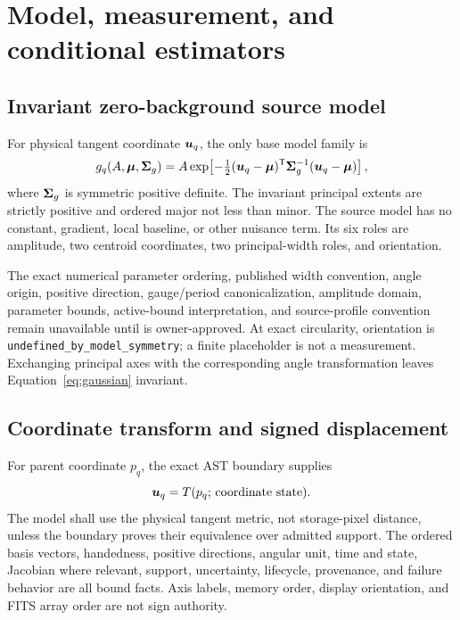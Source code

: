 \section{Model, measurement, and conditional estimators}\label{sec:equations}

\subsection{Invariant zero-background source model}\label{sec:model}

For physical tangent coordinate $\boldsymbol{u}_q$, the only base model family is
\begin{equation}
g_q(A,\boldsymbol{\mu},\boldsymbol{\Sigma}_{g})
=A\exp\!\left[-\tfrac12(\boldsymbol{u}_q-\boldsymbol{\mu})^{\mathsf T}
\boldsymbol{\Sigma}_{g}^{-1}(\boldsymbol{u}_q-\boldsymbol{\mu})\right],
\label{eq:gaussian}
\end{equation}
where $\boldsymbol{\Sigma}_{g}$ is symmetric positive definite. The invariant principal
extents are strictly positive and ordered major not less than minor. The
source model has no constant, gradient, local baseline, or other nuisance
term. Its six roles are amplitude, two centroid coordinates, two
principal-width roles, and orientation.

The exact numerical parameter ordering, published width convention, angle
origin, positive direction, gauge/period canonicalization, amplitude domain,
parameter bounds, active-bound interpretation, and source-profile convention
remain unavailable until \CompatMethod{} is owner-approved. At exact
circularity, orientation is \texttt{undefined\_by\_model\_symmetry}; a finite
placeholder is not a measurement. Exchanging principal axes with the
corresponding angle transformation leaves Equation~\ref{eq:gaussian}
invariant.

\subsection{Coordinate transform and signed displacement}\label{sec:displacement}

For parent coordinate $p_q$, the exact AST boundary supplies
\begin{equation}
\boldsymbol{u}_q=T(p_q;\,\text{coordinate state}).
\label{eq:transform}
\end{equation}
The model shall use the physical tangent metric, not storage-pixel distance,
unless the boundary proves their equivalence over admitted support. The
ordered basis vectors, handedness, positive directions, angular unit, time and
state, Jacobian where relevant, support, uncertainty, lifecycle, provenance,
and failure behavior are all bound facts. Axis labels, memory order, display
orientation, and FITS array order are not sign authority.

